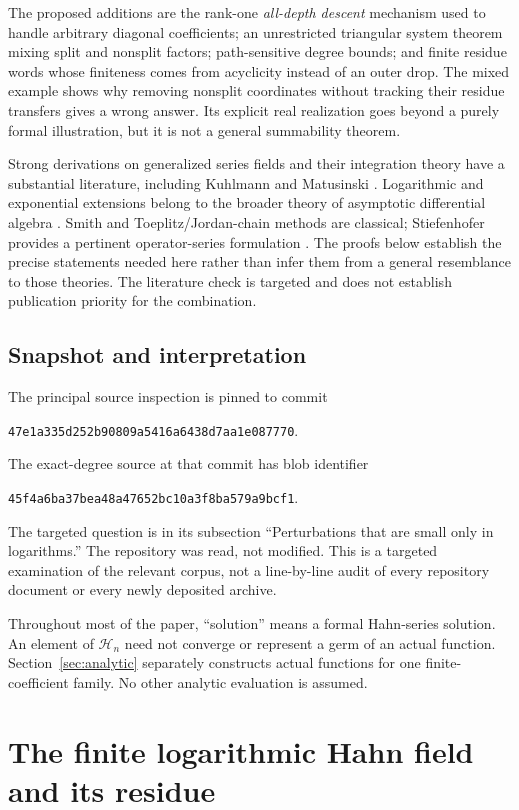 \documentclass[11pt,a4paper]{article}
\numberwithin{equation}{section}
\theoremstyle{definition}
\theoremstyle{remark}\newtheorem{remark}[theorem]{Remark}
\newcommand{\Hh}{\mathcal H}\newcommand{\Ll}{\mathcal L}
\newcommand{\snap}{47e1a335d252b90809a5416a6438d7aa1e087770}
\begin{document}
The proposed additions are the rank-one \emph{all-depth descent} mechanism used to handle arbitrary diagonal coefficients; an unrestricted triangular system theorem mixing split and nonsplit factors; path-sensitive degree bounds; and finite residue words whose finiteness comes from acyclicity instead of an outer drop. The mixed example shows why removing nonsplit coordinates without tracking their residue transfers gives a wrong answer. Its explicit real realization goes beyond a purely formal illustration, but it is not a general summability theorem.

Strong derivations on generalized series fields and their integration theory have a substantial literature, including Kuhlmann and Matusinski \cite{km}. Logarithmic and exponential extensions belong to the broader theory of asymptotic differential algebra \cite{adh,gehret}. Smith and Toeplitz/Jordan-chain methods are classical; Stiefenhofer provides a pertinent operator-series formulation \cite{stief}. The proofs below establish the precise statements needed here rather than infer them from a general resemblance to those theories. The literature check is targeted and does not establish publication priority for the combination.

\subsection{Snapshot and interpretation}
The principal source inspection is pinned to commit
\begin{center}\small\texttt{\snap}.\end{center}
The exact-degree source at that commit has blob identifier
\begin{center}\small\texttt{45f4a6ba37bea48a47652bc10a3f8ba579a9bcf1}.\end{center}
The targeted question is in its subsection ``Perturbations that are small only in logarithms.'' The repository was read, not modified. This is a targeted examination of the relevant corpus, not a line-by-line audit of every repository document or every newly deposited archive.

Throughout most of the paper, ``solution'' means a formal Hahn-series solution. An element of $\Hh_n$ need not converge or represent a germ of an actual function. Section~\ref{sec:analytic} separately constructs actual functions for one finite-coefficient family. No other analytic evaluation is assumed.

\section{The finite logarithmic Hahn field and its residue}
\label{sec:field}
\end{document}
